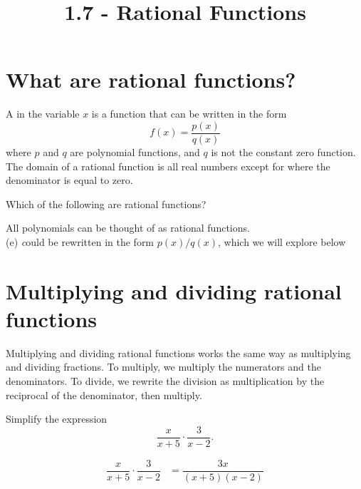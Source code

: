 \documentclass{ximera}
\title{1.7 - Rational Functions}
\begin{document}
\begin{abstract} \end{abstract}
\maketitle


\section{What are rational functions?}
\begin{definition}
  A  in the variable $x$ is a function that can be written in the form
  \[
  f(x) = \frac{p(x)}{q(x)}
  \]
  where $p$ and $q$ are polynomial functions, and $q$ is not the constant zero function. The domain of a rational
  function is all real numbers except for where the denominator is
  equal to zero.
\end{definition}


\begin{question}
  Which of the following are rational functions?
  \begin{selectAll}
  \end{selectAll}
  \begin{feedback}
    All polynomials can be thought of as rational functions.
    \\(e) \emph could be rewritten in the form $p(x)/q(x)$, which we will explore below
  \end{feedback}
\end{question}

\section{Multiplying and dividing rational functions}

Multiplying and dividing rational functions works the same way as multiplying and dividing fractions. To multiply, we multiply the numerators and the denominators. To divide, we rewrite the division as multiplication by the reciprocal of the denominator, then multiply.

\begin{example}
	Simplify the expression \[ \dfrac{x}{x+5}\cdot\dfrac{3}{x-2}. \]
	\begin{explanation}
		\begin{align*}
			\dfrac{x}{x+5}\cdot\dfrac{3}{x-2} &= \dfrac{3x}{(x+5)(x-2)}\\
		\end{align*}
	\end{explanation}
\end{example}
\end{document}

